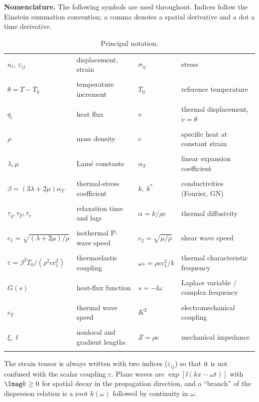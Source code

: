 \documentclass[review,12pt]{elsarticle}
\begin{document}
\noindent\textbf{Nomenclature.} The following symbols are used throughout. Indices follow the Einstein summation convention; a comma denotes a spatial derivative and a dot a time derivative.
\begin{table}[ht]\centering\small
\caption{Principal notation.}\label{tab:nomenclature}
\begin{tabular}{@{}lp{4.1cm}lp{4.3cm}@{}}\toprule
$u_i,\ \varepsilon_{ij}$ & displacement, strain & $\sigma_{ij}$ & stress\\\tabularnewline
$\theta=T-T_0$ & temperature increment & $T_0$ & reference temperature\\\tabularnewline
$q_i$ & heat flux & $v$ & thermal displacement, $\dot v=\theta$\\\tabularnewline
$\rho$ & mass density & $c$ & specific heat at constant strain\\\tabularnewline
$\lambda,\mu$ & Lam\'e constants & $\alpha_T$ & linear expansion coefficient\\\tabularnewline
$\beta=(3\lambda+2\mu)\alpha_T$ & thermal-stress coefficient & $k,\ k^*$ & conductivities (Fourier, GN)\\\tabularnewline
$\tau_q,\tau_T,\tau_v$ & relaxation time and lags & $\alpha=k/\rho c$ & thermal diffusivity\\\tabularnewline
$c_1=\sqrt{(\lambda+2\mu)/\rho}$ & isothermal P-wave speed & $c_2=\sqrt{\mu/\rho}$ & shear wave speed\\\tabularnewline
$\varepsilon=\beta^2T_0/(\rho^2cc_1^2)$ & thermoelastic coupling & $\omega_*=\rho c c_1^2/k$ & thermal characteristic frequency\\\tabularnewline
$G(s)$ & heat-flux function & $s=-\ii\omega$ & Laplace variable / complex frequency\\\tabularnewline
$c_T$ & thermal wave speed & $K^2$ & electromechanical coupling\\\tabularnewline
$\xi,\ell$ & nonlocal and gradient lengths & $Z=\rho c$ & mechanical impedance\\\tabularnewline
\bottomrule
\end{tabular}
\end{table}

The strain tensor is always written with two indices ($\varepsilon_{ij}$) so that it is not confused with the scalar coupling $\varepsilon$. Plane waves are $\exp[\ii(kx-\omega t)]$ with $\Imag k\ge0$ for spatial decay in the propagation direction, and a ``branch'' of the dispersion relation is a root $k(\omega)$ followed by continuity in $\omega$.
\end{document}
